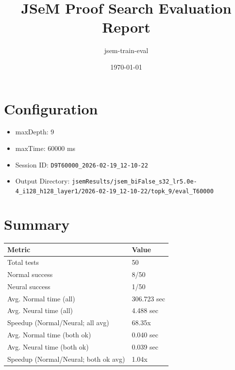 \documentclass[a4paper,10pt]{article}
\title{JSeM Proof Search Evaluation Report}
\author{jsem-train-eval}
\date{\today}
\begin{document}
\maketitle

\section{Configuration}
\begin{itemize}
\item maxDepth: 9
\item maxTime: 60000 ms
\item Session ID: \texttt{D9T60000\_2026-02-19\_12-10-22}
\item Output Directory: \texttt{jsemResults/jsem\_biFalse\_s32\_lr5.0e-4\_i128\_h128\_layer1/2026-02-19\_12-10-22/topk\_9/eval\_T60000}
\end{itemize}

\section{Summary}
\begin{tabular}{ll}
\toprule
\textbf{Metric} & \textbf{Value} \\
\midrule
Total tests & 50 \\
Normal success & 8/50 \\
Neural success & 1/50 \\
\midrule
Avg. Normal time (all) & 306.723 sec \\
Avg. Neural time (all) & 4.488 sec \\
Speedup (Normal/Neural; all avg) & 68.35x \\
Avg. Normal time (both ok) & 0.040 sec \\
Avg. Neural time (both ok) & 0.039 sec \\
Speedup (Normal/Neural; both ok avg) & 1.04x \\
\bottomrule
\end{tabular}
\end{document}

